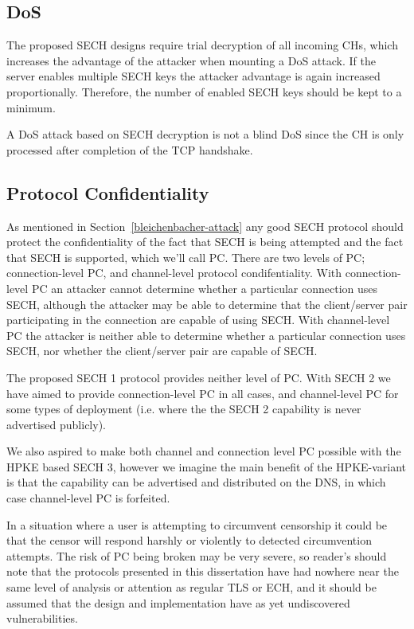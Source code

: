 \subsection{DoS}
The proposed \ac{SECH} designs require trial
decryption of all incoming \ac{CH}s,
which increases the advantage of the attacker
when mounting a \ac{DoS} attack.
If the server enables multiple \ac{SECH} keys
the attacker advantage is again increased
proportionally.
Therefore, the number of enabled \ac{SECH} keys
should be kept to a minimum.

A \ac{DoS} attack based on \ac{SECH} decryption
is not a blind \ac{DoS}
since the \ac{CH}
is only processed after completion of the \ac{TCP}
handshake.

\subsection{Protocol Confidentiality}
As mentioned in Section~\ref{bleichenbacher-attack} any good \ac{SECH} protocol should protect the confidentiality of the fact that \ac{SECH} is being attempted and the fact that \ac{SECH} is supported, which we'll call \ac{PC}.
There are two levels of \ac{PC};
connection-level \ac{PC},
and channel-level protocol condifentiality.
With connection-level \ac{PC} an attacker
cannot determine whether a particular connection uses \ac{SECH},
although the attacker may be able to determine that the
client/server pair participating in the connection are
capable of using \ac{SECH}.
With channel-level \ac{PC} the attacker
is neither able to determine whether a particular
connection uses \ac{SECH},
nor whether the client/server pair are capable of \ac{SECH}.

The proposed \ac{SECH} 1 protocol provides neither level of
\ac{PC}. With \ac{SECH} 2 we have aimed
to provide connection-level \ac{PC} in all cases,
and channel-level \ac{PC} for some types of deployment (i.e. where the the \ac{SECH} 2 capability is 
never advertised publicly).

We also aspired to make both channel and connection level \ac{PC} possible
with the \ac{HPKE} based \ac{SECH} 3, however
we imagine the main benefit of the \ac{HPKE}-variant
is that the capability can be advertised and distributed
on the \ac{DNS},
in which case channel-level \ac{PC} is forfeited.

In a situation where a user is attempting to circumvent censorship it could be that the censor will respond harshly or violently to detected circumvention attempts.
The risk of \ac{PC} being broken may be
very severe, so reader's should note that the protocols
presented in this dissertation have had nowhere near
the same level of analysis or attention as regular \ac{TLS} or \ac{ECH},
and it should be assumed that the design and implementation
have as yet undiscovered vulnerabilities.


